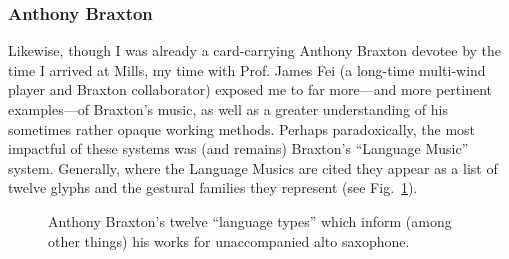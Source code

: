    \subsubsection{Anthony Braxton}
    Likewise, though I was already a card-carrying Anthony Braxton devotee by the time I arrived at Mills, my time with Prof. James Fei (a long-time multi-wind player and Braxton collaborator) exposed me to far more---and more pertinent examples---of Braxton's music, as well as a greater understanding of his sometimes rather opaque working methods. Perhaps paradoxically, the most impactful of these systems was (and remains) Braxton's ``Language Music'' system. Generally, where the Language Musics are cited they appear as a list of twelve glyphs and the gestural families they represent (see Fig.~\ref{fig:language_types}). 

    \begin{figure}
        \centering
        \captionsetup{width=.45\textwidth}
        \caption[Anthony Braxton's twelve ``language types'' which inform (among other things) his works for unaccompanied alto saxophone.]{Anthony Braxton's twelve ``language types'' which inform (among other things) his works for unaccompanied alto saxophone.\footnotemark}
        \label{fig:language_types}
    \end{figure}

